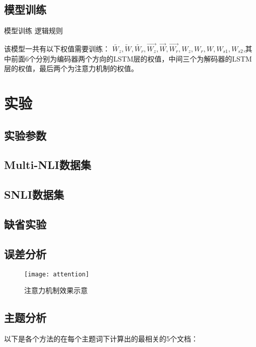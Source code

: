 \documentclass[UTF8,11pt,a4paper,nofonts]{ctexart}
\begin{document}
\subsection{模型训练}

模型训练
逻辑规则

该模型一共有以下权值需要训练：
$\overleftarrow{W_z}, \overleftarrow{W}, \overleftarrow{W_r}, \overrightarrow{W_z}, \overrightarrow{W}, \overrightarrow{W_r},W_z, W_r, W, W_{s1}, W_{s2}$,其中前面6个分别为编码器两个方向的LSTM层的权值，中间三个为解码器的LSTM层的权值，最后两个为注意力机制的权值。



\section{实验}


\subsection{实验参数}
\subsection{Multi-NLI数据集}
\subsection{SNLI数据集}
\subsection{缺省实验}

\subsection{误差分析}


\begin{figure}
\centering
\texttt{[image: attention]}
\caption{注意力机制效果示意}\label{fig:02}
\end{figure} 



\subsection{主题分析}


以下是各个方法的在每个主题词下计算出的最相关的5个文档：
\end{document}
